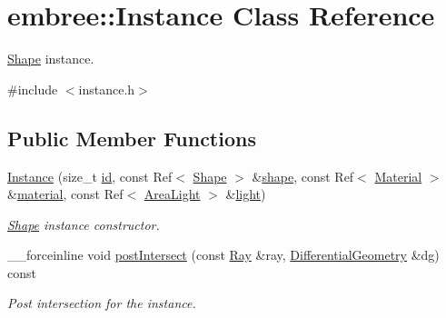 \hypertarget{classembree_1_1_instance}{
\section{embree::Instance Class Reference}
\label{classembree_1_1_instance}
}


\hyperlink{classembree_1_1_shape}{Shape} instance.  




{\ttfamily \#include $<$instance.h$>$}

\subsection*{Public Member Functions}
\begin{DoxyCompactItemize}
\item 
\hyperlink{classembree_1_1_instance_af122cf422e3dab06a6cafcf74ce288dc}{Instance} (size\_\-t \hyperlink{classembree_1_1_instance_ab9ba19e8d4aff6c227a838c32f6b8177}{id}, const Ref$<$ \hyperlink{classembree_1_1_shape}{Shape} $>$ \&\hyperlink{classembree_1_1_instance_aa9909b2b3ee187625a4369ca6b95d5d1}{shape}, const Ref$<$ \hyperlink{classembree_1_1_material}{Material} $>$ \&\hyperlink{classembree_1_1_instance_ad5fe641abd632683f5d19fbc6147451d}{material}, const Ref$<$ \hyperlink{classembree_1_1_area_light}{AreaLight} $>$ \&\hyperlink{classembree_1_1_instance_a49f4f82835231478a9e524a025e35461}{light})
\begin{DoxyCompactList}\small\item\em \hyperlink{classembree_1_1_shape}{Shape} instance constructor. \item\end{DoxyCompactList}\item 
\_\-\_\-forceinline void \hyperlink{classembree_1_1_instance_abdcdfec46b8e1761bda129fc7604335a}{postIntersect} (const \hyperlink{structembree_1_1_ray}{Ray} \&ray, \hyperlink{structembree_1_1_differential_geometry}{DifferentialGeometry} \&dg) const 
\begin{DoxyCompactList}\small\item\em Post intersection for the instance. \item\end{DoxyCompactList}\end{DoxyCompactItemize}
